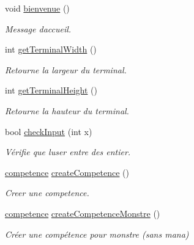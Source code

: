 \begin{DoxyCompactItemize}
void \hyperlink{namespaceio_a7fdf85a0d766d2dcdb9870ae0458826a}{bienvenue} ()
\begin{DoxyCompactList}\small\item\em Message d\textquotesingle{}accueil. \end{DoxyCompactList}\item 
\mbox{\label{namespaceio_a71636a15a219ee1dcc177e9749cf20bc}} 
int \hyperlink{namespaceio_a71636a15a219ee1dcc177e9749cf20bc}{get\+Terminal\+Width} ()
\begin{DoxyCompactList}\small\item\em Retourne la largeur du terminal. \end{DoxyCompactList}\item 
\mbox{\label{namespaceio_ab7da8a98a7b636d1d5f0f6eb820f1f81}} 
int \hyperlink{namespaceio_ab7da8a98a7b636d1d5f0f6eb820f1f81}{get\+Terminal\+Height} ()
\begin{DoxyCompactList}\small\item\em Retourne la hauteur du terminal. \end{DoxyCompactList}\item 
bool \hyperlink{namespaceio_ac79ddb3191a9d00d007eb48deb315942}{check\+Input} (int x)
\begin{DoxyCompactList}\small\item\em Vérifie que l\textquotesingle{}user entre des entier. \end{DoxyCompactList}\item 
\hyperlink{classcompetence}{competence} \hyperlink{namespaceio_a474f817675f4aa2e28f1dac572046eb5}{create\+Competence} ()
\begin{DoxyCompactList}\small\item\em Creer une competence. \end{DoxyCompactList}\item 
\mbox{\label{namespaceio_a15bb99405bc68580d0d386d639a3a23c}} 
\hyperlink{classcompetence}{competence} \hyperlink{namespaceio_a15bb99405bc68580d0d386d639a3a23c}{create\+Competence\+Monstre} ()
\begin{DoxyCompactList}\small\item\em Créer une compétence pour monstre (sans mana) \end{DoxyCompactList}\item 
\mbox{\label{namespaceio_ad3711fbbc414b4d27c255ad8347d3ca2}} 

\end{DoxyCompactItemize}
